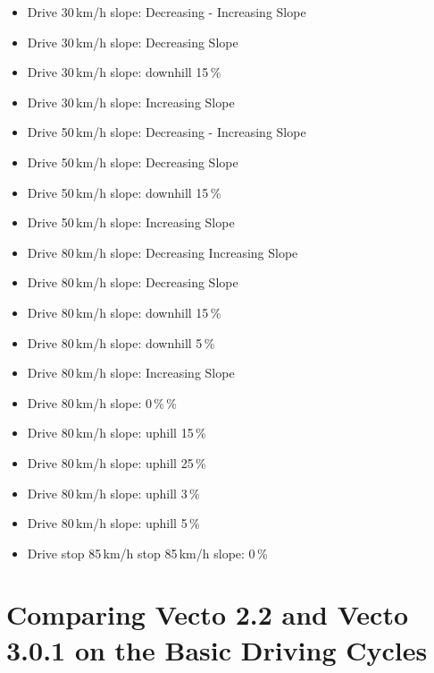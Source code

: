 \begin{itemize}
\item Drive 30\,km/h slope: Decreasing - Increasing Slope
\item Drive 30\,km/h slope: Decreasing Slope
\item Drive 30\,km/h slope: downhill 15\,\%
\item Drive 30\,km/h slope: Increasing Slope
\item Drive 50\,km/h slope: Decreasing - Increasing Slope
\item Drive 50\,km/h slope: Decreasing Slope
\item Drive 50\,km/h slope: downhill 15\,\%
\item Drive 50\,km/h slope: Increasing Slope
\item Drive 80\,km/h slope: Decreasing Increasing Slope
\item Drive 80\,km/h slope: Decreasing Slope
\item Drive 80\,km/h slope: downhill 15\,\%
\item Drive 80\,km/h slope: downhill 5\,\%
\item Drive 80\,km/h slope: Increasing Slope
\item Drive 80\,km/h slope:  0\,\%\,\%
\item Drive 80\,km/h slope: uphill 15\,\%
\item Drive 80\,km/h slope: uphill 25\,\%
\item Drive 80\,km/h slope: uphill 3\,\%
\item Drive 80\,km/h slope: uphill 5\,\%
\item Drive stop 85\,km/h stop 85\,km/h slope:  0\,\%
\end{itemize}


\section{Comparing Vecto 2.2 and Vecto 3.0.1 on the Basic Driving Cycles} %
\label{sec:comparison_vecto_2_2_and_vecto_3_0_1_on_the_basic_driving_cycles}




